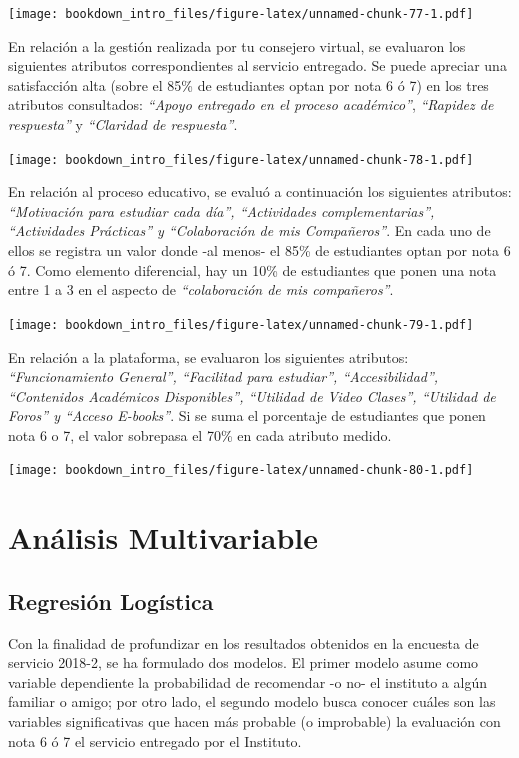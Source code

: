 \documentclass[]{book}
\begin{document}
\texttt{[image: bookdown\_intro\_files/figure-latex/unnamed-chunk-77-1.pdf]}

En relación a la gestión realizada por tu consejero virtual, se
evaluaron los siguientes atributos correspondientes al servicio
entregado. Se puede apreciar una satisfacción alta (sobre el 85\% de
estudiantes optan por nota 6 ó 7) en los tres atributos consultados:
\emph{``Apoyo entregado en el proceso académico''}, \emph{``Rapidez de
respuesta''} y \emph{``Claridad de respuesta''}.

\texttt{[image: bookdown\_intro\_files/figure-latex/unnamed-chunk-78-1.pdf]}

En relación al proceso educativo, se evaluó a continuación los
siguientes atributos: \emph{``Motivación para estudiar cada día'',
``Actividades complementarias'', ``Actividades Prácticas'' y
``Colaboración de mis Compañeros''}. En cada uno de ellos se registra un
valor donde -al menos- el 85\% de estudiantes optan por nota 6 ó 7. Como
elemento diferencial, hay un 10\% de estudiantes que ponen una nota
entre 1 a 3 en el aspecto de \emph{``colaboración de mis compañeros''}.

\texttt{[image: bookdown\_intro\_files/figure-latex/unnamed-chunk-79-1.pdf]}

En relación a la plataforma, se evaluaron los siguientes atributos:
\emph{``Funcionamiento General'', ``Facilitad para estudiar'',
``Accesibilidad'', ``Contenidos Académicos Disponibles'', ``Utilidad de
Video Clases'', ``Utilidad de Foros'' y ``Acceso E-books''}. Si se suma
el porcentaje de estudiantes que ponen nota 6 o 7, el valor sobrepasa el
70\% en cada atributo medido.

\texttt{[image: bookdown\_intro\_files/figure-latex/unnamed-chunk-80-1.pdf]}

\chapter{Análisis Multivariable}\label{analisis-multivariable}

\section{Regresión Logística}\label{regresion-logistica}

Con la finalidad de profundizar en los resultados obtenidos en la
encuesta de servicio 2018-2, se ha formulado dos modelos. El primer
modelo asume como variable dependiente la probabilidad de recomendar -o
no- el instituto a algún familiar o amigo; por otro lado, el segundo
modelo busca conocer cuáles son las variables significativas que hacen
más probable (o improbable) la evaluación con nota 6 ó 7 el servicio
entregado por el Instituto.
\end{document}
